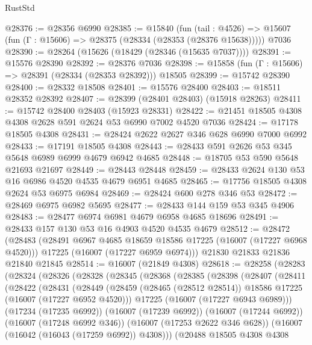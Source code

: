 \begin{lexlean}{RustStd}
\begin{coremodule}
@28376 := @28356 @6990
@28385 := @15840
    (fun (tail : @4526) => @15607 (fun (Γ : @15606) => @28375 (@28334 (@28353 (@28376 @15638)))))
    @7036
@28390 := @28264 (@15626 (@18429 (@28346 (@15635 @7037))))
@28391 := @15576 @28390
@28392 := @28376 @7036
@28398 := @15858 (fun (Γ : @15606) => @28391 (@28334 (@28353 @28392))) @18505
@28399 := @15742 @28390
@28400 := @28332 @18508
@28401 := @15576 @28400
@28403 := @18511 @28352 @28392
@28407 := @28399 (@28401 @28403) (@15918 @28263)
@28411 := @15742 @28400 @28403 (@15923 @28331)
@28422 := @21451 @18505 @4308 @4308 @2628 @591 @2624 @53 @6990 @7002 @4520 @7036
@28424 := @17178 @18505 @4308
@28431 := @28424 @2622 @2627 @346 @628 @6990 @7000 @6992
@28433 := @17191 @18505 @4308
@28443 := @28433 @591 @2626 @53 @345 @5648 @6989 @6999 @4679 @6942 @4685
@28448 := @18705 @53 @590 @5648 @21693 @21697
@28449 := @28443 @28448
@28459 := @28433 @2624 @130 @53 @16 @6986 @4520 @4535 @4679 @6951 @4685
@28465 := @17756 @18505 @4308 @2624 @53 @6975 @6984
@28469 := @28424 @600 @278 @346 @53
@28472 := @28469 @6975 @6982 @5695
@28477 := @28433 @144 @159 @53 @345 @4906
@28483 := @28477 @6974 @6981 @4679 @6958 @4685 @18696
@28491 := @28433 @157 @130 @53 @16 @4903 @4520 @4535 @4679
@28512 := @28472
    (@28483
      (@28491 @6967 @4685 @18659 @18586 @17225 (@16007 (@17227 @6968 @4520)))
      @17225
      (@16007 (@17227 @6959 @6974)))
    @21830
    @21833
    @21836
    @21840
    @21845
@28514 := @16007 (@21849 @4308)
@28618 := @28258
    (@28283
      (@28324
        (@28326
          (@28328
            (@28345
              (@28368
                (@28385
                  (@28398
                    (@28407
                      (@28411
                        (@28422
                          (@28431
                            (@28449
                              (@28459
                                (@28465 (@28512 @28514))
                                @18586
                                @17225
                                (@16007 (@17227 @6952 @4520)))
                              @17225
                              (@16007 (@17227 @6943 @6989)))
                            (@17234 (@17235 @6992))
                            (@16007 (@17239 @6992))
                            (@16007 (@17244 @6992))
                            (@16007 (@17248 @6992 @346))
                            (@16007 (@17253 @2622 @346 @628))
                            (@16007 (@16042 (@16043 (@17259 @6992)) @4308)))
                          (@20488
                            @18505
                            @4308
                            @4308

\end{coremodule}
\end{lexlean}
